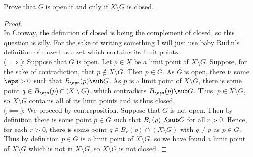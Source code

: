 \documentclass[12pt]{article}
\begin{document}
\begin{homeworkProblem}
  
Prove that $ G $ is open if and only if $ X\setminus G $ is closed.

\begin{proof}\,\\
  In Conway, the definition of closed is being the complement of closed, so this question is silly. For the sake of writing something I will just use baby Rudin's definition of closed as a set which contains its limit points.\\

  \underline{($\implies $)}: Suppose that $ G $ is open. Let $ p\in X $ be a limit point of $ X\setminus G $. Suppose, for the sake of contradiction, that $ p\not\in X\setminus G $. Then $ p\in G $. As $ G $ is open, there is some $ \eps>0 $ such that $ B_{\eps}(p)\sub G $. As $ p $ is a limit point of $ X\setminus G $, there is some point $ q\in B_{\eps}(p)\cap (X\setminus G) $, which contradicts $ B_{\eps}(p)\sub G $. Thus, $ p\in X\setminus G $, so $ X\setminus G $ contains all of its limit points and is thus closed.\\


  \underline{($\impliedby $)}: We proceed by contraposition. Suppose that $ G $ is not open. Then by definition there is some point $ p\in G $ such that $ B_{r}(p)\not\sub G $ for all $ r>0 $. Hence, for each $ r>0 $, there is some point $ q\in B_{r}(p)\cap (X\setminus G) $ with $ q\neq p $ as $ p\in G $. Thus by definition $ p\in G $ is a limit point of $ X\setminus G $, so we have found a limit point of $ X\setminus G $ which is not in $ X\setminus G $, so $ X\setminus G $ is not closed.
  
\end{proof}

\end{homeworkProblem}  
\end{document}
